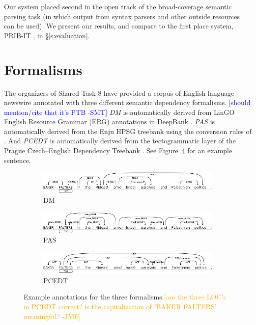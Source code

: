 \documentclass[11pt]{article}
\newcommand{\sam}[1]{\textcolor{blue}{[#1 -SMT]}}
\newcommand{\jmf}[1]{\textcolor{orange}{[#1 -JMF]}}
\begin{document}
Our system placed second in the open track of the broad-coverage semantic
parsing task (in which output from syntax parsers and other outside resources can be used).
We present our results, and compare to the first place system, PRIB-IT
\cite{martins_prib_2014}, in \S\ref{s:evaluation}.



\section{Formalisms} \label{s:formalisms}

The organizers of Shared Task 8 have provided a corpus of English language
newswire annotated with three different semantic dependency formalisms.
\sam{should mention/cite that it's PTB}
\emph{DM} is automatically derived from LinGO English Resource Grammar (ERG)
annotations in DeepBank \cite{flickinger_deepbank_2012}.
\emph{PAS} is automatically derived from the Enju HPSG treebank using the
conversion rules of .
And \emph{PCEDT} is automatically derived from the tectogrammatic layer of the
Prague Czech--English Dependency Treebank \cite{hajic_building_1998}.
See Figure~\ref{fig:formalisms} for an example sentence.
\begin{figure}
	\centering
	\begin{subfigure}{0.7\textwidth}
		\includegraphics[width=\textwidth]{fig/example_dm}
		\caption{DM}
		\label{fig:dm}
	\end{subfigure}
	\begin{subfigure}{0.7\textwidth}
		\includegraphics[width=\textwidth]{fig/example_pas}
		\caption{PAS}
		\label{fig:pas}
	\end{subfigure}
	\begin{subfigure}{0.7\textwidth}
		\includegraphics[width=\textwidth]{fig/example_pcedt}
		\caption{PCEDT}
		\label{fig:pcedt}
	\end{subfigure}
	\caption{Example annotations for the three formalisms.\jmf{are the
    three LOC's in PCEDT correct? is the capitalization of 'BAKER
    FALTERS' meaningful?}}
	\label{fig:formalisms}
\end{figure}
\end{document}
